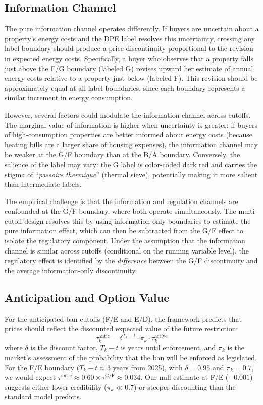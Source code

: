 \documentclass[12pt]{article}
\begin{document}
\subsection{Information Channel}

The pure information channel operates differently. If buyers are uncertain about a property's energy costs and the DPE label resolves this uncertainty, crossing any label boundary should produce a price discontinuity proportional to the revision in expected energy costs. Specifically, a buyer who observes that a property falls just above the F/G boundary (labeled G) revises upward her estimate of annual energy costs relative to a property just below (labeled F). This revision should be approximately equal at all label boundaries, since each boundary represents a similar increment in energy consumption.

However, several factors could modulate the information channel across cutoffs. The marginal value of information is higher when uncertainty is greater: if buyers of high-consumption properties are better informed about energy costs (because heating bills are a larger share of housing expenses), the information channel may be weaker at the G/F boundary than at the B/A boundary. Conversely, the salience of the label may vary: the G label is color-coded dark red and carries the stigma of ``\textit{passoire thermique}'' (thermal sieve), potentially making it more salient than intermediate labels.

The empirical challenge is that the information and regulation channels are confounded at the G/F boundary, where both operate simultaneously. The multi-cutoff design resolves this by using information-only boundaries to estimate the pure information effect, which can then be subtracted from the G/F effect to isolate the regulatory component. Under the assumption that the information channel is similar across cutoffs (conditional on the running variable level), the regulatory effect is identified by the \textit{difference} between the G/F discontinuity and the average information-only discontinuity.

\subsection{Anticipation and Option Value}

For the anticipated-ban cutoffs (F/E and E/D), the framework predicts that prices should reflect the discounted expected value of the future restriction:
\begin{equation}
    \tau_k^{\text{antic}} = \delta^{T_k - t} \cdot \pi_k \cdot \tau_k^{\text{active}}
\end{equation}
where $\delta$ is the discount factor, $T_k - t$ is years until enforcement, and $\pi_k$ is the market's assessment of the probability that the ban will be enforced as legislated. For the F/E boundary ($T_k - t \approx 3$ years from 2025), with $\delta = 0.95$ and $\pi_k = 0.7$, we would expect $\tau^{\text{antic}} \approx 0.60 \times \tau^{\text{G/F}} \approx 0.034$. Our null estimate at F/E ($-0.001$) suggests either lower credibility ($\pi_k \ll 0.7$) or steeper discounting than the standard model predicts.
\end{document}
